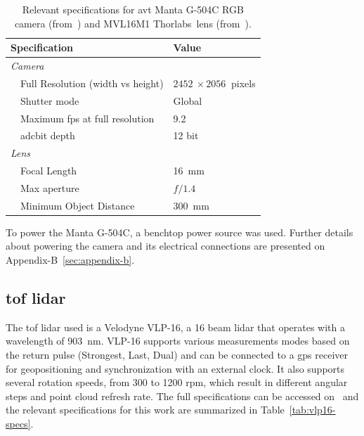 \begin{table}[!ht]
	\renewcommand{\arraystretch}{1.2}
	\centering
	\begin{tabular}{@{}lp{7cm}l@{}}
		\toprule
		\multicolumn{2}{l}{Specification} & Value \\ \midrule
		\multicolumn{2}{l}{\emph{Camera}} & \\
		\phantom{a} & Full Resolution (width vs height) & $\SI{2452}{} \times \SI{2056}{}$ pixels \\
									& Shutter mode & Global \\
									&	Maximum \ac{fps} at full resolution & \SI{9.2}{} \\ 
									& \acs{adc}\footnotemark bit depth & \SI{12}{} bit \\\midrule 
									\multicolumn{2}{l}{\emph{Lens}} \\
									&	Focal Length & \SI{16}{\milli\meter} \\
									&	Max aperture & $f/1.4$ \\
									&	Minimum Object Distance & \SI{300}{\milli\meter}  \\
		\bottomrule
	\end{tabular}
	\caption[Relevant specifications of the camera and its lens.]{Relevant specifications for \ac{avt} Manta G-504C RGB camera (from~\cite{MantaG504C})  and MVL16M1 Thorlabs\cp~lens (from~\cite{Thorlabs}).}
	\label{tab:camera-and-lens-specs}
\end{table}


To power the Manta G-504C, a benchtop power source was used. Further details about powering the camera and its electrical connections are presented on Appendix-B~\ref{sec:appendix-b}.

\subsection{\acs{tof} \acs{lidar}}
The \ac{tof} \ac{lidar} used is a Velodyne VLP-16\texttrademark, a 16 beam \ac{lidar} that operates with a wavelength of \SI{903}{\nano\meter}. VLP-16 supports various measurements modes based on the return pulse (Strongest, Last, Dual) and can be connected to a \ac{gps} receiver for geopositioning and synchronization with an external clock. It also supports several rotation speeds, from 300 to 1200 \ac{rpm}, which result in different angular steps and point cloud refresh rate. The full specifications can be accessed on~\cite{VLP16} and the relevant specifications for this work are summarized in Table~\ref{tab:vlp16-specs}.

